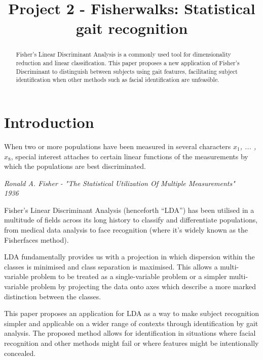 \documentclass{bmvc2k}
\title{Project 2 - Fisherwalks: Statistical gait recognition}
\begin{document}
\maketitle

\begin{abstract}

   Fisher's Linear Discriminant Analysis is a commonly used tool for dimensionality reduction and linear classification. This paper proposes a new application of Fisher's Discriminant to distinguish between subjects using gait features, facilitating subject identification when other methods such as facial identification are unfeasible.

\end{abstract}

\section{Introduction}

\begin{center}

   When two or more populations have been measured in several characters \textit{$x_1$, ... , $x_8$}, special interest attaches to certain linear functions of the measurements by which the populations are best discriminated.

   \begin{flushright}
      \textit{
         Ronald A. Fisher - "The Statistical Utilization Of Multiple Measurements"\\
         1936
      }
   \end{flushright}
\end{center}

Fisher’s Linear Discriminant Analysis (henceforth “LDA”) has been utilised in a multitude of fields across its long history to classify and differentiate populations, from medical data analysis to face recognition (where it’s widely known as the Fisherfaces method).

LDA fundamentally provides us with a projection in which dispersion within the classes is minimised and class separation is maximised\cite{fisher}. This allows a multi-variable problem to be treated as a single-variable problem or a simpler multi-variable problem by projecting the data onto axes which describe a more marked distinction between the classes\cite{dimred}\cite{statanalysis}.

This paper proposes an application for LDA as a way to make subject recognition simpler and applicable on a wider range of contexts through identification by gait analysis. The proposed method allows for identification in situations where facial recognition and other methods might fail or where features might be intentionally concealed.
\end{document}
